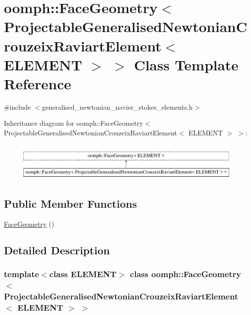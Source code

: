 \hypertarget{classoomph_1_1FaceGeometry_3_01ProjectableGeneralisedNewtonianCrouzeixRaviartElement_3_01ELEMENT_01_4_01_4}{}\section{oomph\+:\+:Face\+Geometry$<$ Projectable\+Generalised\+Newtonian\+Crouzeix\+Raviart\+Element$<$ E\+L\+E\+M\+E\+NT $>$ $>$ Class Template Reference}
\label{classoomph_1_1FaceGeometry_3_01ProjectableGeneralisedNewtonianCrouzeixRaviartElement_3_01ELEMENT_01_4_01_4}


{\ttfamily \#include $<$generalised\+\_\+newtonian\+\_\+navier\+\_\+stokes\+\_\+elements.\+h$>$}

Inheritance diagram for oomph\+:\+:Face\+Geometry$<$ Projectable\+Generalised\+Newtonian\+Crouzeix\+Raviart\+Element$<$ E\+L\+E\+M\+E\+NT $>$ $>$\+:\begin{figure}[H]
\begin{center}
\leavevmode
\includegraphics[height=1.941074cm]{classoomph_1_1FaceGeometry_3_01ProjectableGeneralisedNewtonianCrouzeixRaviartElement_3_01ELEMENT_01_4_01_4}
\end{center}
\end{figure}
\subsection*{Public Member Functions}
\begin{DoxyCompactItemize}
\item 
\hyperlink{classoomph_1_1FaceGeometry_3_01ProjectableGeneralisedNewtonianCrouzeixRaviartElement_3_01ELEMENT_01_4_01_4_a07471ca209a75a458300ccce4cd7a685}{Face\+Geometry} ()
\end{DoxyCompactItemize}


\subsection{Detailed Description}
\subsubsection*{template$<$class E\+L\+E\+M\+E\+NT$>$\newline
class oomph\+::\+Face\+Geometry$<$ Projectable\+Generalised\+Newtonian\+Crouzeix\+Raviart\+Element$<$ E\+L\+E\+M\+E\+N\+T $>$ $>$}

